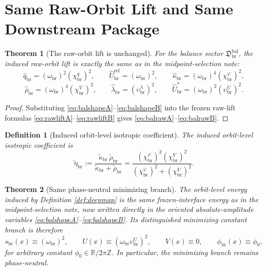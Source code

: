 \documentclass[11pt]{article}
\newcommand{\RespShapeCov}{\widetilde\kappa_{\mathrm{br}}}
\newcommand{\RespShapeRelax}{\widetilde\rho_{\mathrm{br}}}
\newcommand{\RespShapeIso}{\widetilde\eta_{\mathrm{br}}}
\newcommand{\RespRawReadout}{\widehat q_{\mathrm{br}}}
\newcommand{\RespRawRef}{\widehat U_{\mathrm{br}}^{\mathrm{ref}}}
\newcommand{\RespRawCov}{\widehat\kappa_{\mathrm{br}}}
\newcommand{\RespRawRelax}{\widehat\rho_{\mathrm{br}}}
\newcommand{\RespRawWell}{\widehat\lambda_{\mathrm{br}}}
\newcommand{\RespRawEq}{\widehat U_{\mathrm{br}}^{\ast}}
\newcommand{\RespVacPhase}{\phi_{\mathrm{br}}}
\newcommand{\ScaleMod}{s_{\mathrm{br}}}
\newcommand{\AbsReadAmp}{\chi_{\mathrm{br}}^{q}}
\newcommand{\AbsCovAmp}{\chi_{\mathrm{br}}^{\varphi}}
\newcommand{\AbsRelaxAmp}{\chi_{\mathrm{br}}^{V}}
\newcommand{\AbsWellAmp}{\upsilon_{\mathrm{br}}^{\lambda}}
\newcommand{\AbsEqAmp}{\upsilon_{\mathrm{br}}^{U}}
\newcommand{\AbsScaleAmp}{\omega_{\mathrm{br}}}
\newcommand{\MidBalanceSector}{\mathfrak D_{\mathrm{br}}^{\mathrm{bal}}}
\newtheorem{definition}{Definition}
\newtheorem{theorem}{Theorem}
\begin{document}
\section{Same Raw-Orbit Lift and Same Downstream Package}

\begin{theorem}[The raw-orbit lift is unchanged]
\label{thm:balraw}
For the balance sector \(\MidBalanceSector\), the induced raw-orbit lift is exactly the same as in the midpoint-selection note:
\begin{equation}
\RespRawReadout=(\AbsScaleAmp)^{2}(\AbsReadAmp)^{2},
\qquad
\RespRawRef=(\AbsScaleAmp)^{2},
\qquad
\RespRawCov=(\AbsScaleAmp)^{4}(\AbsCovAmp)^{2},
\label{eq:balrawA}
\end{equation}
\begin{equation}
\RespRawRelax=(\AbsScaleAmp)^{4}(\AbsRelaxAmp)^{2},
\qquad
\RespRawWell=(\AbsWellAmp)^{2},
\qquad
\RespRawEq=(\AbsScaleAmp)^{2}(\AbsEqAmp)^{2}.
\label{eq:balrawB}
\end{equation}
\end{theorem}

\begin{proof}
Substituting \eqref{eq:balshapeA}--\eqref{eq:balshapeB} into the frozen raw-lift formulas \eqref{eq:rawliftA}--\eqref{eq:rawliftB} gives \eqref{eq:balrawA}--\eqref{eq:balrawB}.
\end{proof}

\begin{definition}[Induced orbit-level isotropic coefficient]
\label{def:isocoeff}
The induced orbit-level isotropic coefficient is
\begin{equation}
\RespShapeIso
:=
\frac{\RespShapeCov\,\RespShapeRelax}{\RespShapeCov+\RespShapeRelax}
=
\frac{(\AbsCovAmp)^{2}(\AbsRelaxAmp)^{2}}{(\AbsCovAmp)^{2}+(\AbsRelaxAmp)^{2}}.
\label{eq:baliso}
\end{equation}
\end{definition}

\begin{theorem}[Same phase-neutral minimizing branch]
\label{thm:balbranch}
The orbit-level energy induced by Definition \ref{def:deepmap} is the same frozen-interface energy as in the midpoint-selection note, now written directly in the oriented absolute-amplitude variables \eqref{eq:balshapeA}--\eqref{eq:balshapeB}. Its distinguished minimizing constant branch is therefore
\begin{equation}
\ScaleMod(x)\equiv(\AbsScaleAmp)^{2},
\qquad
U(x)\equiv(\AbsScaleAmp\AbsEqAmp)^{2},
\qquad
V(x)\equiv0,
\qquad
\RespVacPhase(x)\equiv\phi_{0},
\label{eq:balbranch}
\end{equation}
for arbitrary constant \(\phi_{0}\in\mathbb R/2\pi\mathbb Z\). In particular, the minimizing branch remains phase-neutral.
\end{theorem}
\end{document}
